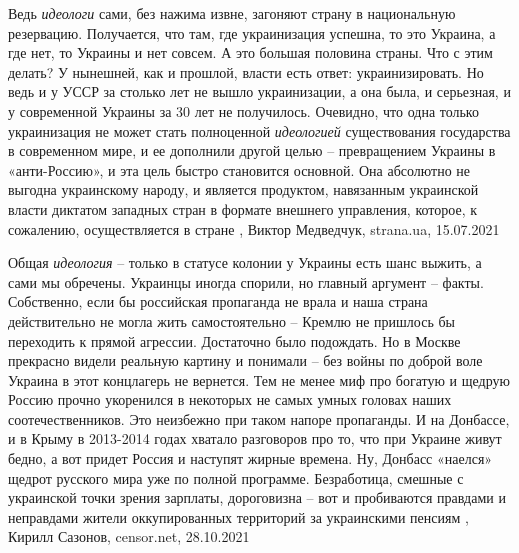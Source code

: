 Ведь \emph{идеологи} сами, без нажима извне, загоняют страну в национальную
резервацию. Получается, что там, где украинизация успешна, то это Украина, а
где нет, то Украины и нет совсем. А это большая половина страны. Что с этим
делать? У нынешней, как и прошлой, власти есть ответ: украинизировать. Но ведь
и у УССР за столько лет не вышло украинизации, а она была, и серьезная, и у
современной Украины за 30 лет не получилось. Очевидно, что одна только
украинизация не может стать полноценной \emph{идеологией} существования государства в
современном мире, и ее дополнили другой целью – превращением Украины в
«анти-Россию», и эта цель быстро становится основной.  Она абсолютно не выгодна
украинскому народу, и является продуктом, навязанным украинской власти диктатом
западных стран в формате внешнего управления, которое, к сожалению,
осуществляется в стране
, 
Виктор Медведчук, strana.ua, 15.07.2021

Общая \emph{идеология} – только в статусе колонии у Украины есть шанс выжить, а
сами мы обречены. Украинцы иногда спорили, но главный аргумент – факты.
Собственно, если бы российская пропаганда не врала и наша страна действительно
не могла жить самостоятельно – Кремлю не пришлось бы переходить к прямой
агрессии.  Достаточно было подождать. Но в Москве прекрасно видели реальную
картину и понимали – без войны по доброй воле Украина в этот концлагерь не
вернется.  Тем не менее миф про богатую и щедрую Россию прочно укоренился в
некоторых не самых умных головах наших соотечественников. Это неизбежно при
таком напоре пропаганды. И на Донбассе, и в Крыму в 2013-2014 годах хватало
разговоров про то, что при Украине живут бедно, а вот придет Россия и наступят
жирные времена.  Ну, Донбасс «наелся» щедрот русского мира уже по полной
программе. Безработица, смешные с украинской точки зрения зарплаты, дороговизна
– вот и пробиваются правдами и неправдами жители оккупированных территорий за
украинскими пенсиям 
, Кирилл Сазонов, censor.net, 28.10.2021%

